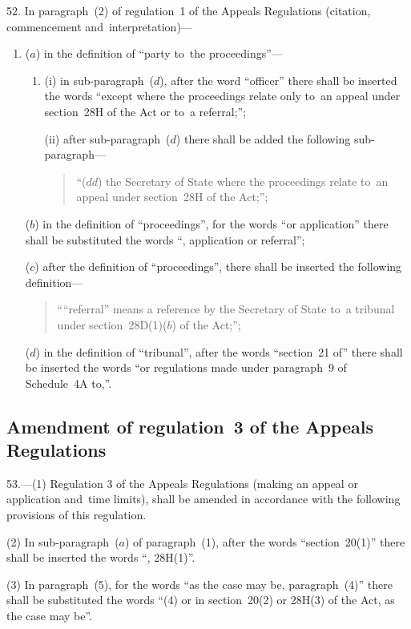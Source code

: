 \documentclass[12pt,a4paper]{article}
\begin{document}
52. In paragraph~(2) of regulation~1 of the Appeals Regulations
(citation, commencement and~interpretation)—
\begin{enumerate}\item[]
($a$) in the definition of “party to~the proceedings”—
\begin{enumerate}\item[]
(i) in sub-paragraph~($d$), after the word “officer” there shall be inserted the
words “except where the proceedings relate only to~an appeal under section~28H
of the Act or to~a referral;”;

(ii) after sub-paragraph~($d$) there shall be added the following sub-paragraph—
\begin{quotation}
“($dd$) the Secretary of State where the proceedings relate to~an appeal under
section~28H of the Act;”;
\end{quotation}
\end{enumerate}

($b$) in the definition of “proceedings”, for the words “or application” there
shall be substituted the words “, application or referral”;

($c$) after the definition of “proceedings”, there shall be inserted the following
definition—
\begin{quotation}
““referral” means a reference by the Secretary of State to~a tribunal under
section~28D(1)($b$) of the Act;”;
\end{quotation}

($d$) in the definition of “tribunal”, after the words “section~21 of” there shall
be inserted the words “or regulations made under paragraph~9 of Schedule~4A
to,”.
\end{enumerate}

\subsection[53. Amendment of regulation~3 of the Appeals Regulations]{Amendment of regulation~3 of the Appeals Regulations}

53.—(1) Regulation 3 of the
Appeals Regulations (making an appeal or application and~time limits), shall be
amended in accordance with the following provisions of this regulation.

(2) In sub-paragraph~($a$) of paragraph~(1), after the words “section~20(1)” there
shall be inserted the words “, 28H(1)”.

(3) In paragraph~(5), for the words “as the case may be, paragraph~(4)” there
shall be substituted the words “(4) or in section~20(2) or 28H(3) of the Act, as
the case may be”.
\end{document}

